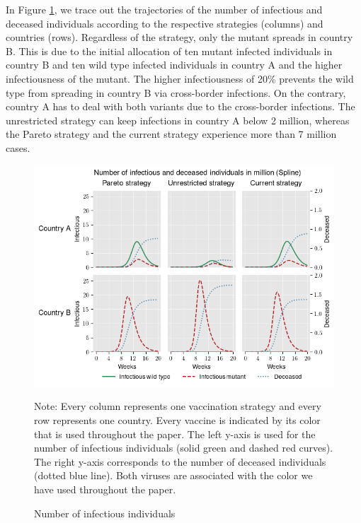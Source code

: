 In Figure \ref{fig:results_splines_infectious_dead}, we trace out the trajectories of the number of infectious and deceased individuals according to the respective strategies (columns) and countries (rows). Regardless of the strategy, only the mutant spreads in country B. This is due to the initial allocation of ten mutant infected individuals in country B and ten wild type infected individuals in country A and the higher infectiousness of the mutant. The higher infectiousness of 20\% prevents the wild type from spreading in country B via cross-border infections. On the contrary, country A has to deal with both variants due to the cross-border infections. The unrestricted strategy can keep infections in country A below 2 million, whereas the Pareto strategy and the current strategy experience more than 7 million cases. 


\begin{figure}[h!]
\centering
\includegraphics[scale=0.85]{images/splines_infectious_dead.png}
\begin{flushleft}
\scriptsize{Note:} Every column represents one vaccination strategy and every row represents one country. Every vaccine is indicated by its color that is used throughout the paper. The left y-axis is used for the number of infectious individuals (solid green and dashed red curves). The right y-axis corresponds to the number of deceased individuals (dotted blue line). Both viruses are associated with the color we have used throughout the paper. 
\end{flushleft}
\caption{Number of infectious individuals}
\label{fig:results_splines_infectious_dead}
\end{figure}



